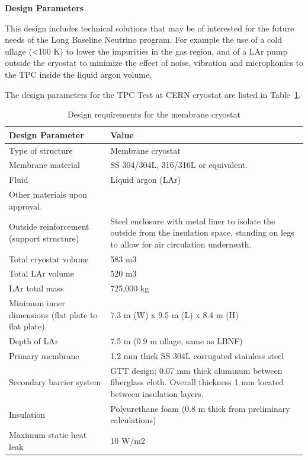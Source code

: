 \textbf{Design Parameters}

This design includes technical solutions that may be of interested for the future needs of the Long Baseline Neutrino program. For example the use of a cold ullage (\textless  100 K) to lower the impurities in the gas region, and of a LAr pump outside the cryostat to minimize the effect of noise, vibration and microphonics to the TPC inside the liquid argon volume.

The design parameters for the TPC Test at CERN cryostat are listed in Table~\ref{tbl:cryogenics-design-parameters}.

\begin{table}[htpb]
\caption{Design requirements for the membrane cryostat}
\label{tbl:cryogenics-design-parameters}
\centering
\begin{tabular}{|p{}|p{}|}
\hline
\textbf{Design Parameter} & \textbf{Value} \\ \hline
Type of structure & Membrane cryostat \\ \hline
Membrane material    &  SS 304/304L, 316/316L or equivalent. \\ \hline
Fluid & Liquid argon (LAr)  \\ \hline
Other materials upon approval.\\ \hline
 Outside reinforcement (support structure)  &  Steel enclosure with metal liner to isolate the outside from the insulation space, standing on legs to allow for air circulation underneath. \\ \hline
 Total cryostat volume  &  583 m3 \\ \hline
 Total LAr volume  &  520 m3 \\ \hline
LAr total mass   & 725,000 kg  \\ \hline
Minimum inner dimensions (flat plate to flat plate).   &  7.3 m (W) x 9.5 m (L) x 8.4 m (H) \\ \hline
Depth of LAr   &  7.5 m (0.9 m ullage, same as LBNF) \\ \hline
Primary membrane   &   1.2 mm thick SS 304L corrugated stainless steel\\ \hline
Secondary barrier system   &  GTT design; 0.07 mm thick aluminum between fiberglass cloth. Overall thickness 1 mm located between insulation layers.  \\ \hline
 Insulation  &  Polyurethane foam (0.8 m thick from preliminary calculations) \\ \hline
Maximum static heat leak   &  10 W/m2 \\ \hline

\end{tabular}
\end{table}
